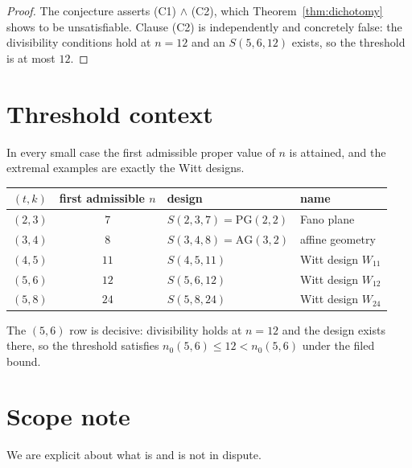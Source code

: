 \documentclass[11pt]{article}
\theoremstyle{definition}
\theoremstyle{remark}
\newcommand{\Wtwelve}{W_{12}}
\begin{document}
\begin{proof}
The conjecture asserts (C1) $\wedge$ (C2), which Theorem~\ref{thm:dichotomy}
shows to be unsatisfiable. Clause (C2) is independently and concretely false:
the divisibility conditions hold at $n=12$ and an $S(5,6,12)$ exists, so the
threshold is at most $12$.
\end{proof}

\section{Threshold context}

In every small case the first admissible proper value of $n$ is attained, and
the extremal examples are exactly the Witt designs.

\begin{center}
\begin{tabular}{c c l l}
\toprule
$(t,k)$ & first admissible $n$ & design & name \\
\midrule
$(2,3)$ & $7$  & $S(2,3,7) = \mathrm{PG}(2,2)$ & Fano plane \\
$(3,4)$ & $8$  & $S(3,4,8) = \mathrm{AG}(3,2)$ & affine geometry \\
$(4,5)$ & $11$ & $S(4,5,11)$ & Witt design $W_{11}$ \\
$(5,6)$ & $12$ & $S(5,6,12)$ & Witt design $\Wtwelve$ \\
$(5,8)$ & $24$ & $S(5,8,24)$ & Witt design $W_{24}$ \\
\bottomrule
\end{tabular}
\end{center}

The $(5,6)$ row is decisive: divisibility holds at $n = 12$ and the design
exists there, so the threshold satisfies $n_0(5,6) \le 12 < n_0(5,6)$ under the
filed bound.

\section{Scope note}

We are explicit about what is and is not in dispute.
\end{document}

